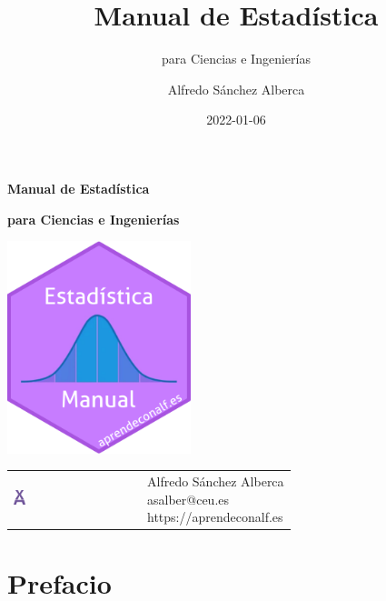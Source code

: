 \documentclass[
  a4paper,
]{scrreport}
\title{Manual de Estadística}
\subtitle{para Ciencias e Ingenierías}
\author{Alfredo Sánchez Alberca}
\date{2022-01-06}
\renewcommand*\contentsname{Indice de contenidos}
\newcommand\contentsname{Indice de contenidos}
\theoremstyle{plain}
\theoremstyle{definition}
\theoremstyle{definition}
\theoremstyle{remark}
\begin{document}
\begin{titlepage}

\begin{center}
\vspace*{5cm}

\Huge
{\textbf{\textsf{Manual de Estadística}}}

\vspace{0.5cm}
\LARGE
{\textbf{\textsf{para Ciencias e Ingenierías}}}

\vspace{1.5cm}

\includegraphics[width=0.4\textwidth]{img/logos/sticker.png}
\end{center}

\vfill

\begin{flushleft}
\begin{tabular}{ll}
\includegraphics[width=0.1\textwidth]{img/logos/aprendeconalf.png} & \parbox[b]{5cm}{\Large\textsf{Alfredo
Sánchez
Alberca}\\ \textsf{asalber@ceu.es} \\ \textsf{https://aprendeconalf.es}}
\end{tabular}
\end{flushleft}
\end{titlepage}
\renewcommand*\contentsname{Indice de contenidos}
{
\hypersetup{linkcolor=}
\setcounter{tocdepth}{2}
\tableofcontents
}

\chapter*{Prefacio}\label{prefacio}
\end{document}
